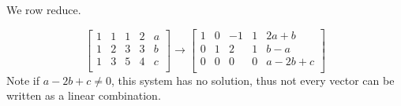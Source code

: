 \documentclass{article}
\begin{document}
\begin{example}
  We row reduce.

  \[
    \begin{bmatrix}
      1 & 1 & 1 & 2 & a\\
      1 & 2 & 3 & 3 & b\\
      1 & 3 & 5 & 4 & c\\
    \end{bmatrix}
    \to
    \begin{bmatrix}
      1 & 0 & -1 & 1 & 2a + b\\
      0 & 1 & 2 & 1 & b-a\\
      0 & 0 & 0 & 0 & a-2b+c\\
    \end{bmatrix}
  \]
  Note if $a - 2b + c \neq 0$, this system has no solution, thus not every vector can be written as a linear combination.


\end{example}
\end{document}
